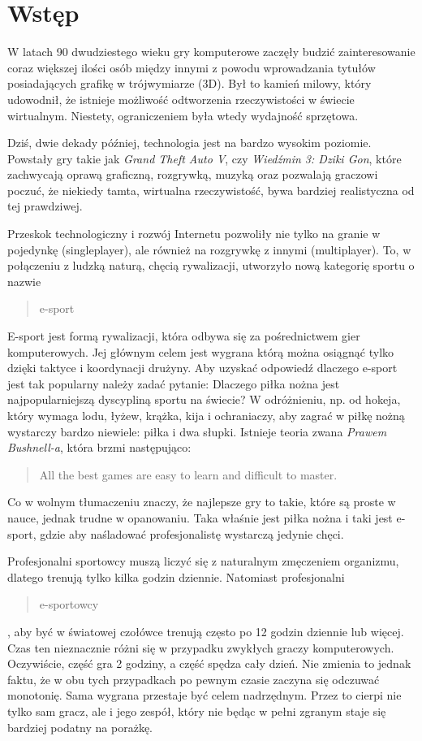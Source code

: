 \section{Wstęp}
	W latach 90 dwudziestego wieku gry komputerowe zaczęły budzić zainteresowanie coraz większej ilości osób między innymi z powodu wprowadzania tytułów posiadających grafikę w trójwymiarze (3D). Był to kamień milowy, który udowodnił, że istnieje możliwość odtworzenia rzeczywistości w świecie wirtualnym. Niestety, ograniczeniem była wtedy wydajność sprzętowa.\par
	Dziś, dwie dekady później, technologia jest na bardzo wysokim poziomie. Powstały gry takie jak \textit{Grand Theft Auto V}, czy \textit{Wiedźmin 3: Dziki Gon}, które zachwycają oprawą graficzną, rozgrywką, muzyką oraz pozwalają graczowi poczuć, że niekiedy tamta, wirtualna rzeczywistość, bywa bardziej realistyczna od tej prawdziwej.\par
	Przeskok technologiczny i rozwój Internetu pozwoliły nie tylko na granie w pojedynkę (singleplayer), ale również na rozgrywkę z innymi (multiplayer). To, w połączeniu z ludzką naturą, chęcią rywalizacji, utworzyło nową kategorię sportu o nazwie \blockquote{e-sport}.\par
	E-sport jest formą rywalizacji, która odbywa się za pośrednictwem gier komputerowych. Jej głównym celem jest wygrana którą można osiągnąć tylko dzięki taktyce i koordynacji drużyny. Aby uzyskać odpowiedź dlaczego e-sport jest tak popularny należy zadać pytanie: Dlaczego piłka nożna jest najpopularniejszą dyscypliną sportu na świecie? \cite{footballPopularity} W odróżnieniu, np. od hokeja, który wymaga lodu, łyżew, krążka, kija i ochraniaczy, aby zagrać w piłkę nożną wystarczy bardzo niewiele: piłka i dwa słupki. Istnieje teoria zwana \textit{Prawem Bushnell-a}, która brzmi następująco:
	\begin{center}
		\blockquote{All the best games are easy to learn and difficult to master.} \cite{burshnellsLaw}
	\end{center}
Co w wolnym tłumaczeniu znaczy, że najlepsze gry to takie, które są proste w nauce, jednak trudne w opanowaniu. Taka właśnie jest piłka nożna i taki jest e-sport, gdzie aby naśladować profesjonalistę wystarczą jedynie chęci.\par
	Profesjonalni sportowcy muszą liczyć się z naturalnym zmęczeniem organizmu, dlatego trenują tylko kilka godzin dziennie. Natomiast profesjonalni \blockquote{e-sportowcy}, aby być w światowej czołówce trenują często po 12 godzin dziennie lub więcej. \cite{proPlayerPlayTime} Czas ten nieznacznie różni się w przypadku zwykłych graczy komputerowych. Oczywiście, część gra 2 godziny, a część spędza cały dzień. Nie zmienia to jednak faktu, że w obu tych przypadkach po pewnym czasie zaczyna się odczuwać monotonię. Sama wygrana przestaje być celem nadrzędnym. Przez to cierpi nie tylko sam gracz, ale i jego zespół, który nie będąc w pełni zgranym staje się bardziej podatny na porażkę.\par
